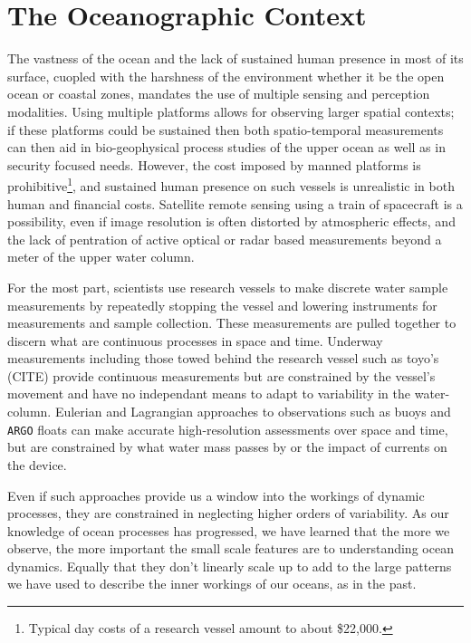 \section{The Oceanographic Context}
\label{sec:context}

The vastness of the ocean and the lack of sustained human presence in
most of its surface, cuopled with the harshness of the environment
whether it be the open ocean or coastal zones, mandates the use of
multiple sensing and perception modalities. Using multiple platforms
allows for observing larger spatial contexts; if these platforms could
be sustained then both spatio-temporal measurements can then aid in
bio-geophysical process studies of the upper ocean as well as in
security focused needs. However, the cost imposed by manned platforms
is prohibitive\footnote{Typical day costs of a research vessel amount
  to about \$22,000.}, and sustained human presence on such vessels is
unrealistic in both human and financial costs. Satellite remote
sensing using a train of spacecraft is a possibility, even if image
resolution is often distorted by atmospheric effects, and the lack of
pentration of active optical or radar based measurements beyond a
meter of the upper water column.

For the most part, scientists use research vessels to make discrete
water sample measurements by repeatedly stopping the vessel and lowering
instruments for measurements and sample collection. These measurements
are pulled together to discern what are continuous processes in space
and time. Underway measurements including those towed behind the
research vessel such as toyo's (CITE) provide continuous measurements
but are constrained by the vessel's movement and have no independant
means to adapt to variability in the water-column. Eulerian and
Lagrangian approaches to observations such as buoys and \texttt{ARGO}
floats \cite{roemmich09} can make accurate high-resolution assessments
over space and time, but are constrained by what water mass passes by or
the impact of currents on the device.

Even if such approaches provide us a window into the workings of dynamic
processes, they are constrained in neglecting higher orders of
variability. As our knowledge of ocean processes has progressed, we have
learned that the more we observe, the more important the small scale
features are to understanding ocean dynamics. Equally that they don't
linearly scale up to add to the large patterns we have used to describe
the inner workings of our oceans, as in the past. 

